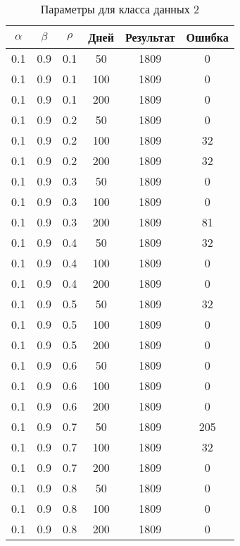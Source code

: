\renewcommand{\thetable}{A.2}
\begin{table}[h]
	\begin{center}
        \begin{threeparttable}
        \captionsetup{justification=raggedright,singlelinecheck=off}
		\caption{Параметры для класса данных 2\label{tbl:table_kd2}}
		\begin{tabular}{|c|c|c|c|c|c|}
		\hline
		$\alpha$ & $\beta$ & $\rho$ & Дней & Результат & Ошибка 
		\\ \hline
		0.1 &  0.9 &  0.1 &   50 &  1809 &     0 \\
		0.1 &  0.9 &  0.1 &  100 &  1809 &     0 \\
		0.1 &  0.9 &  0.1 &  200 &  1809 &     0 \\
	   \hline
		0.1 &  0.9 &  0.2 &   50 &  1809 &     0 \\
		0.1 &  0.9 &  0.2 &  100 &  1809 &    32 \\
		0.1 &  0.9 &  0.2 &  200 &  1809 &    32 \\
	   \hline
		0.1 &  0.9 &  0.3 &   50 &  1809 &     0 \\
		0.1 &  0.9 &  0.3 &  100 &  1809 &     0 \\
		0.1 &  0.9 &  0.3 &  200 &  1809 &    81 \\
	   \hline
		0.1 &  0.9 &  0.4 &   50 &  1809 &    32 \\
		0.1 &  0.9 &  0.4 &  100 &  1809 &     0 \\
		0.1 &  0.9 &  0.4 &  200 &  1809 &     0 \\
	   \hline
		0.1 &  0.9 &  0.5 &   50 &  1809 &    32 \\
		0.1 &  0.9 &  0.5 &  100 &  1809 &     0 \\
		0.1 &  0.9 &  0.5 &  200 &  1809 &     0 \\
	   \hline
		0.1 &  0.9 &  0.6 &   50 &  1809 &     0 \\
		0.1 &  0.9 &  0.6 &  100 &  1809 &     0 \\
		0.1 &  0.9 &  0.6 &  200 &  1809 &     0 \\
	   \hline
		0.1 &  0.9 &  0.7 &   50 &  1809 &   205 \\
		0.1 &  0.9 &  0.7 &  100 &  1809 &    32 \\
		0.1 &  0.9 &  0.7 &  200 &  1809 &     0 \\
	   \hline
		0.1 &  0.9 &  0.8 &   50 &  1809 &     0 \\
		0.1 &  0.9 &  0.8 &  100 &  1809 &     0 \\
		0.1 &  0.9 &  0.8 &  200 &  1809 &     0 \\

\end{tabular}
\end{threeparttable}
\end{center}
\end{table}
